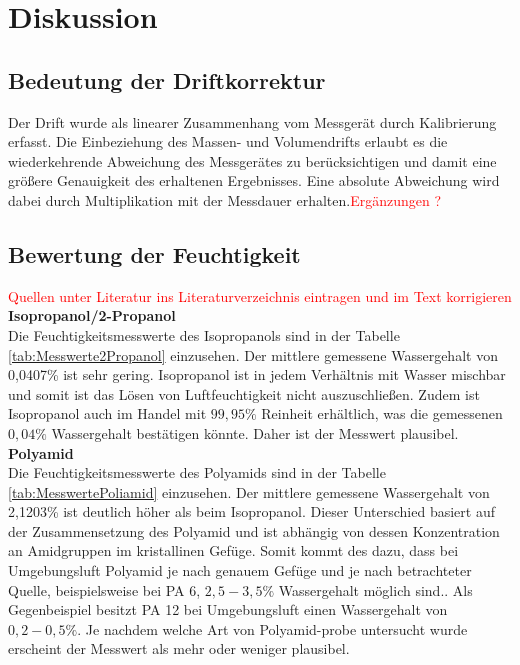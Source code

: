 \section{Diskussion}
\label{sec:diskussion}


\subsection{Bedeutung der Driftkorrektur}
Der Drift wurde als linearer Zusammenhang vom Messgerät durch Kalibrierung erfasst. Die Einbeziehung des Massen- und Volumendrifts erlaubt es die wiederkehrende Abweichung des Messgerätes zu berücksichtigen und damit eine größere Genauigkeit des erhaltenen Ergebnisses. Eine absolute Abweichung wird dabei durch Multiplikation mit der Messdauer erhalten.\textcolor{red}{Ergänzungen ?}

\subsection{Bewertung der Feuchtigkeit}
\textcolor{red}{Quellen unter Literatur ins Literaturverzeichnis eintragen und im Text korrigieren}\\

\textbf{Isopropanol/2-Propanol}\\
Die Feuchtigkeitsmesswerte des Isopropanols sind in der Tabelle \ref{tab:Messwerte2Propanol} einzusehen. Der mittlere gemessene Wassergehalt von 0,0407\% ist sehr gering. Isopropanol ist in jedem Verhältnis mit Wasser mischbar und somit ist das Lösen von Luftfeuchtigkeit nicht auszuschließen.\cite{isopropanol} Zudem ist Isopropanol auch im Handel mit $99,95\%$ Reinheit erhältlich, was die gemessenen $0,04\%$ Wassergehalt bestätigen könnte.\cite{XXX} Daher ist der Messwert plausibel.\\

\textbf{Polyamid}\\
Die Feuchtigkeitsmesswerte des Polyamids sind in der Tabelle \ref{tab:MesswertePoliamid} einzusehen. Der mittlere gemessene Wassergehalt von 2,1203\% ist deutlich höher als beim Isopropanol. Dieser Unterschied basiert auf der Zusammensetzung des Polyamid und ist abhängig von dessen Konzentration an Amidgruppen im kristallinen Gefüge. Somit kommt des dazu, dass bei Umgebungsluft Polyamid je nach genauem Gefüge und je nach betrachteter Quelle, beispielsweise bei PA 6, $2,5-3,5\%$ Wassergehalt möglich sind.\cite{XXX}. Als Gegenbeispiel besitzt PA 12 bei Umgebungsluft einen Wassergehalt von $0,2-0,5\%$.\cite{XX} Je nachdem welche Art von Polyamid-probe untersucht wurde erscheint der Messwert als mehr oder weniger plausibel.\\

